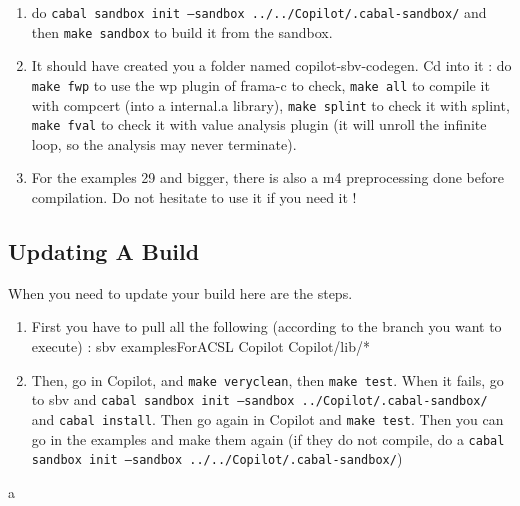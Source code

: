 \begin{enumerate}
\item do \texttt{cabal sandbox init --sandbox ../../Copilot/.cabal-sandbox/} and then \texttt{make sandbox} to build it from the sandbox.
\item It should have created you a folder named copilot-sbv-codegen. Cd into it :
\subitem do \texttt{make fwp} to use the wp plugin of frama-c to check, \texttt{make all} to compile it with compcert (into a internal.a library), \texttt{make splint} to check it with splint, \texttt{make fval} to check it with value analysis plugin (it will unroll the infinite loop, so the analysis may never terminate).
\item For the examples 29 and bigger, there is also a m4 preprocessing done before compilation. Do not hesitate to use it if you need it !
\end{enumerate}


\subsection{Updating A Build}
When you need to update your build here are the steps.

\begin{enumerate}
\item First you have to pull all the following (according to the branch you want to execute) :
\subitem sbv
\subitem examplesForACSL
\subitem Copilot
\subitem Copilot/lib/*
\item Then, go in Copilot, and \texttt{make veryclean}, then \texttt{make test}. When it fails, go to sbv and \texttt{cabal sandbox init --sandbox ../Copilot/.cabal-sandbox/} and \texttt{cabal install}. Then go again in Copilot and \texttt{make test}. Then you can go in the examples and make them again (if they do not compile, do a \texttt{cabal sandbox init --sandbox ../../Copilot/.cabal-sandbox/})
\end{enumerate}a



